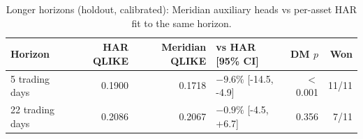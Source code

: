 \begin{table}[!htbp]
\centering
\small
\caption{Longer horizons (holdout, calibrated): Meridian auxiliary heads vs per-asset HAR fit to the same horizon.}
\label{tab:volhorizon}
\begin{tabularx}{\linewidth}{Xrrlrr}
\toprule
\textbf{Horizon} & \textbf{HAR QLIKE} & \textbf{Meridian QLIKE} & \textbf{vs HAR [95\% CI]} & \textbf{DM $p$} & \textbf{Won} \\
\midrule
5 trading days & 0.1900 & 0.1718 & $-9.6\%$ [-14.5, -4.9] & $<$0.001 & 11/11 \\
22 trading days & 0.2086 & 0.2067 & $-0.9\%$ [-4.5, +6.7] & 0.356 & 7/11 \\
\bottomrule
\end{tabularx}
\end{table}
